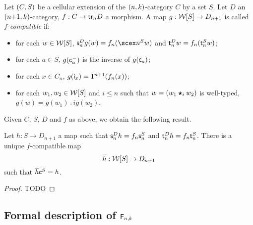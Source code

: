  \begin{paragr}
   Let $(C,S)$ be a cellular extension of the $(n,k)$-category
   $C$ by a set $S$.  Let
$D$ an $(n{+}1,k)$-category, $f:C\to \mathsf{tr}_{n}
   D$ a morphism. A map $g:\mathcal{W}[S]\to D_{n+1}$ is called {\em $f$-compatible} if:
   \begin{itemize}
   \item for each $w\in\mathcal{W}[S]$, $\sce n^Dg(w)=f_n(\scex n^S w)$ and
     $\mathsf{t}_{n}^D w=f_n(\mathsf{t}_{n}^S w)$;
    \item for each $a\in S$, $g(\mathsf{c}^{-}_{a})$ is the inverse of $g(\mathsf{c}_{a})$;
    \item for each $x\in C_n$, $g(\mathsf{i}_{x})=1^{n+1}(f_n(x))$;
    \item for each $w_1,w_2\in\mathcal{W}[S]$ and $i\leq n$ such that
      $w=(w_1\bm{\star}_{i} w_2)$ is well-typed, $g(w)=g(w_1)\comp i g(w_2)$.  
    \end{itemize}
    Given $C$, $S$, $D$ and $f$ as above, we obtain the following result.
  \end{paragr}
  \begin{lemma}\label{lemma:mapext}
    Let $h:S\to D_{n+1}$ a map such that $\mathsf{s}_{n}^Dh=f_n \mathsf{s}_{n}^S$ and $\mathsf{t}_{n}^Dh=f_{n} \mathsf{t}_{n}^S$. There is a unique
    $f$-compatible map
    \[\overline{h}:\mathcal{W}[S]\to D_{n+1}\]
    such that $\overline{h}\mathsf{c}^{S}=h$.
  \end{lemma}
  \begin{proof}
    TODO
  \end{proof}
  
  
\subsection{Formal description of $\mathsf{F}_{n,k}$}\label{subsec:congruence}

  
